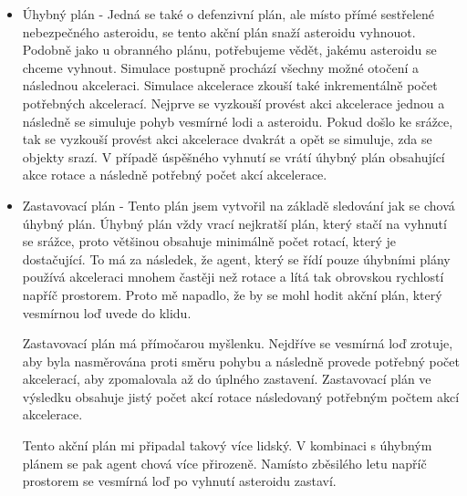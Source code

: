 \begin{itemize}
    \item Úhybný plán - Jedná se také o defenzivní plán, ale místo přímé sestřelené nebezpečného asteroidu, se tento akční plán snaží asteroidu vyhnouot.
    Podobně jako u obranného plánu, potřebujeme vědět, jakému asteroidu se chceme vyhnout. Simulace postupně prochází všechny možné otočení a následnou akceleraci.
    Simulace akcelerace zkouší také inkrementálně počet potřebných akcelerací. Nejprve se vyzkouší provést akci akcelerace jednou a následně se simuluje pohyb vesmírné lodi a asteroidu.
    Pokud došlo ke srážce, tak se vyzkouší provést akci akcelerace dvakrát a opět se simuluje, zda se objekty srazí. 
    V případě úspěšného vyhnutí se vrátí úhybný plán obsahující akce rotace a následně potřebný počet akcí akcelerace.
    
    \item Zastavovací plán - Tento plán jsem vytvořil na základě sledování jak se chová úhybný plán. Úhybný plán vždy vrací nejkratší plán, který stačí na vyhnutí se srážce, proto většinou obsahuje minimálně počet rotací, který je dostačující.
        To má za následek, že agent, který se řídí pouze úhybními plány používá akceleraci mnohem častěji než rotace a lítá tak obrovskou rychlostí napříč prostorem. Proto mě napadlo, že by se mohl hodit akční plán, který vesmírnou loď uvede do klidu.
        \par
        Zastavovací plán má přímočarou myšlenku. 
        Nejdříve se vesmírná loď zrotuje, aby byla nasměrována proti směru pohybu a následně provede potřebný počet akcelerací, aby zpomalovala až do úplného zastavení. 
        Zastavovací plán ve výsledku obsahuje jistý počet akcí rotace následovaný potřebným počtem akcí akcelerace. 

        \par
        Tento akční plán mi připadal takový více lidský. V kombinaci s úhybným plánem se pak agent chová více přirozeně.
        Namísto zběsilého letu napříč prostorem se vesmírná loď po vyhnutí asteroidu zastaví.            
        
\end{itemize}


